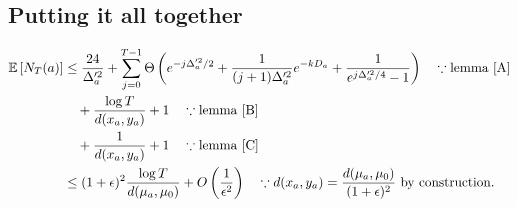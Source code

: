 \documentclass[11pt]{article}
\begin{document}
\subsection{Putting it all together}
\begin{align*}\mathbb{E}\left[ N_T(a) \right]&\le \frac{24}{\Delta_a'^2} + \sum_{j=0}^{T-1}\Theta\left(e^{-j\Delta_a'^2/2}+ \frac{1}{(j+1)\Delta_a'^2}e^{-kD_a}+ \frac{1}{e^{j\Delta_a'^2/4}-1}\right) \quad\because \mbox{lemma \ref{A}}\\
 &\quad+\frac{\log T}{d(x_a,y_a)} + 1 \quad \because \mbox{lemma \ref{B}}\\
 &\quad+ \frac{1}{d(x_a,y_a)}+ 1\quad \because \mbox{lemma \ref{C}}\\
 &\le (1+\epsilon)^2 \frac{\log T}{d(\mu_a,\mu_0)} + O\left(\frac{1}{\epsilon^2}\right) \quad \because d(x_a,y_a) = \frac{d(\mu_a,\mu_0)}{(1+\epsilon)^2} \mbox{ by construction.}
\end{align*}

\end{document}
